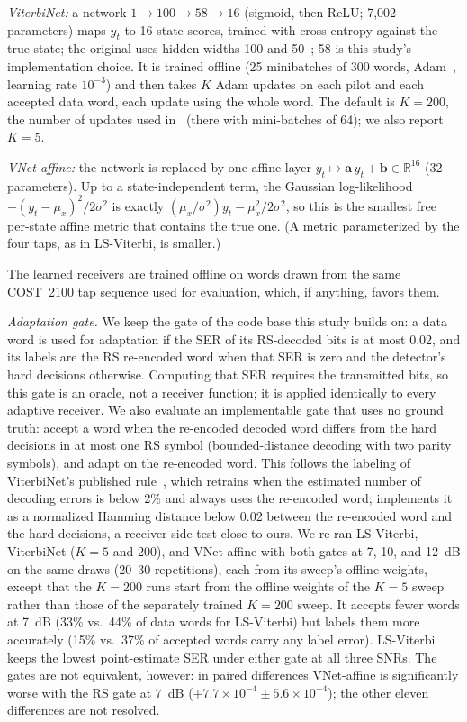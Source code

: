 \documentclass[journal]{IEEEtran}
\begin{document}
\emph{ViterbiNet:} a network $1\to100\to58\to16$ (sigmoid, then ReLU; 7,002 parameters) maps $y_t$ to 16 state scores, trained with cross-entropy against the true state; the original uses hidden widths 100 and 50~\cite{shlezinger2020viterbinet}; 58 is this study's implementation choice. It is trained offline (25 minibatches of 300 words, Adam~\cite{kingma2015adam}, learning rate $10^{-3}$) and then takes $K$ Adam updates on each pilot and each accepted data word, each update using the whole word. The default is $K=200$, the number of updates used in~\cite{raviv2023online} (there with mini-batches of 64); we also report $K=5$.

\emph{VNet-affine:} the network is replaced by one affine layer $y_t\mapsto \mathbf a\,y_t+\mathbf b\in\mathbb R^{16}$ (32 parameters). Up to a state-independent term, the Gaussian log-likelihood $-(y_t-\mu_x)^2/2\sigma^2$ is exactly $(\mu_x/\sigma^2)y_t-\mu_x^2/2\sigma^2$, so this is the smallest free per-state affine metric that contains the true one. (A metric parameterized by the four taps, as in LS-Viterbi, is smaller.)

The learned receivers are trained offline on words drawn from the same COST~2100 tap sequence used for evaluation, which, if anything, favors them.

\emph{Adaptation gate.} We keep the gate of the code base this study builds on: a data word is used for adaptation if the SER of its RS-decoded bits is at most 0.02, and its labels are the RS re-encoded word when that SER is zero and the detector's hard decisions otherwise. Computing that SER requires the transmitted bits, so this gate is an oracle, not a receiver function; it is applied identically to every adaptive receiver. We also evaluate an implementable gate that uses no ground truth: accept a word when the re-encoded decoded word differs from the hard decisions in at most one RS symbol (bounded-distance decoding with two parity symbols), and adapt on the re-encoded word. This follows the labeling of ViterbiNet's published rule~\cite[Alg.~2]{shlezinger2020viterbinet}, which retrains when the estimated number of decoding errors is below 2\% and always uses the re-encoded word; \cite{raviv2023online} implements it as a normalized Hamming distance below 0.02 between the re-encoded word and the hard decisions, a receiver-side test close to ours. We re-ran LS-Viterbi, ViterbiNet ($K=5$ and 200), and VNet-affine with both gates at 7, 10, and 12~dB on the same draws (20--30 repetitions), each from its sweep's offline weights, except that the $K=200$ runs start from the offline weights of the $K=5$ sweep rather than those of the separately trained $K=200$ sweep. It accepts fewer words at 7~dB (33\% vs.\ 44\% of data words for LS-Viterbi) but labels them more accurately (15\% vs.\ 37\% of accepted words carry any label error). LS-Viterbi keeps the lowest point-estimate SER under either gate at all three SNRs. The gates are not equivalent, however: in paired differences VNet-affine is significantly worse with the RS gate at 7~dB ($+7.7\times10^{-4}\pm5.6\times10^{-4}$); the other eleven differences are not resolved.
\end{document}
